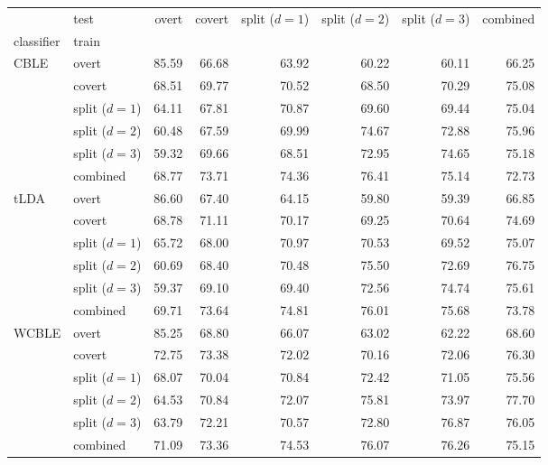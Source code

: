 \sffamily
\footnotesize
\begin{tabularx}{\textwidth}{@{}XXrrrrrr@{}}
\toprule
  & test & overt & covert & \makecell[r]{\footnotesize split \\ ($d=1$)} &
  \makecell[r]{\footnotesize split
  \\($d=2$)} & \makecell[r]{\footnotesize split \\ ($d=3$)} & combined \\
classifier & train &  &  &  &  &  &  \\
\midrule
\multirow[t]{6}{*}{CBLE} & overt & 85.59 & 66.68 & 63.92 & 60.22 & 60.11 & 66.25 \\
 & covert & 68.51 & 69.77 & 70.52 & 68.50 & 70.29 & 75.08 \\
  & {\footnotesize split ($d=1$)} & 64.11 & 67.81 & 70.87 & 69.60 & 69.44 & 75.04 \\
  & {\footnotesize split ($d=2$)} & 60.48 & 67.59 & 69.99 & 74.67 & 72.88 & 75.96 \\
  & {\footnotesize split ($d=3$)} & 59.32 & 69.66 & 68.51 & 72.95 & 74.65 & 75.18 \\
 & combined & 68.77 & 73.71 & 74.36 & 76.41 & 75.14 & 72.73 \\
\midrule
\multirow[t]{6}{*}{tLDA} & overt & 86.60 & 67.40 & 64.15 & 59.80 & 59.39 & 66.85 \\
 & covert & 68.78 & 71.11 & 70.17 & 69.25 & 70.64 & 74.69 \\
  & {\footnotesize split ($d=1$)} & 65.72 & 68.00 & 70.97 & 70.53 & 69.52 & 75.07 \\
  & {\footnotesize split ($d=2$)} & 60.69 & 68.40 & 70.48 & 75.50 & 72.69 & 76.75 \\
  & {\footnotesize split ($d=3$)} & 59.37 & 69.10 & 69.40 & 72.56 & 74.74 & 75.61 \\
 & combined & 69.71 & 73.64 & 74.81 & 76.01 & 75.68 & 73.78 \\
\midrule
\multirow[t]{6}{*}{WCBLE} & overt & 85.25 & 68.80 & 66.07 & 63.02 & 62.22 & 68.60 \\
 & covert & 72.75 & 73.38 & 72.02 & 70.16 & 72.06 & 76.30 \\
  & {\footnotesize split ($d=1$)} & 68.07 & 70.04 & 70.84 & 72.42 & 71.05 & 75.56 \\
 & {\footnotesize split ($d=2$)} & 64.53 & 70.84 & 72.07 & 75.81 & 73.97 & 77.70 \\
  & {\footnotesize split ($d=3$)} & 63.79 & 72.21 & 70.57 & 72.80 & 76.87 & 76.05 \\
 & combined & 71.09 & 73.36 & 74.53 & 76.07 & 76.26 & 75.15 \\
\bottomrule
\end{tabularx}
